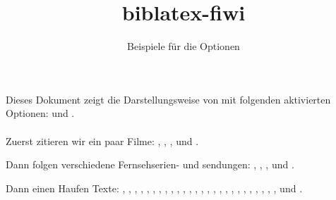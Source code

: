 \documentclass[a4paper]{scrartcl}
\begin{document}
\title{biblatex-fiwi}\subtitle{Beispiele für die Optionen}\date{}\maketitle
\noindent Dieses Dokument zeigt die Darstellungsweise von  mit folgenden aktivierten Optionen:   und . \\ \\

\noindent Zuerst zitieren wir ein paar Filme: , , ,  und .

Dann folgen verschiedene Fernsehserien- und sendungen: , , ,  und .

Dann einen Haufen Texte: \textcite{sklovskij.v:1969a} \textcite{Spiegel.S:2010c}, \textcite{Muller.A:2010a}, \textcite{Wells.H:1908}, \textcite{Spiegel.S:2007b}, \textcite{Lukian.1981}, \textcite{Kepler.J:1993}, \textcite{Coleridge:1983a}, \textcite{vonMatt.P:2002}, \textcite{Keitz.U:2004a}, \textcite{Wells.HG:1980}, \textcite{Ackerman.Strickland:1981}, \textcite{Anderson.P:1971a}, \textcite{Gaudreault.A:1993}, \textcite{Poe.E:1982c}, \textcite{Poe.E:1999a}, \textcite{Parrinder.P:1980}, \textcite{Wells.H:1980*2}, \textcite{James.H:2004a}, \textcite{James.H:2007a}, \textcite{Hedeler.W:2005a}, \textcite{Ballhausen.T:2009a}, \textcite{Zymner.R:2003a}, \textcite{Zymner.R:2011a}, \textcite{Nelmes.J:2011b}, \textcite{Kuhn.A:1990*2,Blish.J:1973a,Dureau.Y:2005a}, \textcite{Todorov.T:1992}, \textcite{Bordwell.D:2004a} und \textcite{Kirchner.A:2008a}.


\printbibliography[nottype=movie]
\newrefcontext[sorting=title]
\printbibliography[type=movie,heading=film]
\end{document}
